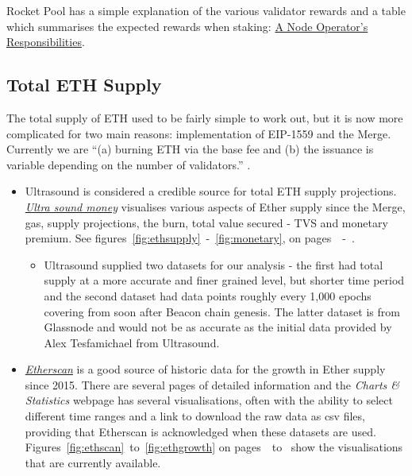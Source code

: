 \documentclass[UTF8]{article}
\begin{document}
{Rocket Pool has a simple explanation of the various validator rewards and a table which summarises the expected rewards when staking: \href{https://docs.rocketpool.net/guides/node/responsibilities.html}{A Node Operator's Responsibilities}.
\clearpage
 \subsection{Total ETH Supply}
\label{sec:ethsupply} 
        The total supply of ETH used to be fairly simple to work out, but it is now more complicated for two main reasons:  implementation of EIP-1559 and the Merge.
Currently we are ``(a) burning ETH via the base fee and (b) the issuance is variable depending on the number of validators.'' \cite{Edgington2023}. 
\begin{itemize}
	\item Ultrasound is considered a credible source for total ETH supply projections. \\\textit{\href{https://ultrasound.money/}{Ultra sound money}} visualises various aspects of Ether supply since the Merge, gas, supply projections, the burn, total value secured - TVS and monetary premium. See figures~\ref{fig:ethsupply}~-~\ref{fig:monetary}, on pages~\pageref{fig:ethsupply}~-~\pageref{fig:monetary}.  

\begin{itemize}
	\item Ultrasound supplied two datasets for our analysis - the first had total supply at a more accurate and finer grained level, but shorter time period and the second dataset had data points roughly every 1,000 epochs covering from soon after Beacon chain genesis. The latter dataset is from Glassnode and would not be as accurate as the initial data provided by Alex Tesfamichael from Ultrasound.
\end{itemize}
	\item \textit{\href{https://etherscan.io/chart/ethersupplygrowth}{Etherscan}} is a good source of historic data for the growth in Ether supply since 2015. There are several pages of detailed information and the \textit{Charts \& Statistics} webpage has several visualisations, often with the ability to select different time ranges and a link to download the raw data as csv files, providing that Etherscan is acknowledged when these datasets are used.\\
	Figures~\ref{fig:ethscan}~to~\ref{fig:ethgrowth} on pages~\pageref{fig:ethscan}~to~\pageref{fig:ethgrowth} show the visualisations that are currently available.
\end{itemize}

}
\end{document}
